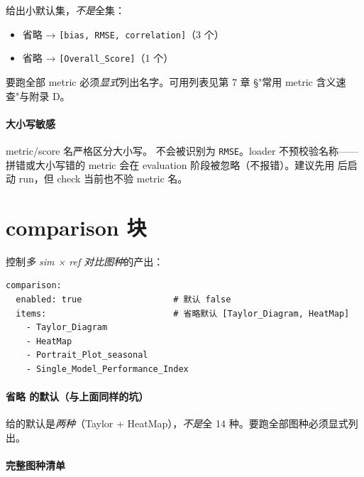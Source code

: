  给出小默认集，\emph{不是}全集：

\begin{itemize}
  \item {} 省略 → \texttt{[bias, RMSE, correlation]}（3 个）
  \item {} 省略 → \texttt{[Overall\_Score]}（1 个）
\end{itemize}

要跑全部 metric 必须\emph{显式}列出名字。可用列表见第 7 章 §"常用 metric 含义速查"与附录 D。

\paragraph{大小写敏感}

metric/score 名严格区分大小写。 不会被识别为 \texttt{RMSE}。loader 不预校验名称——拼错或大小写错的 metric 会在 evaluation 阶段被忽略（不报错）。建议先用  后启动 run，但 check 当前也不验 metric 名。

\section{comparison 块}

 控制\emph{多 sim × ref 对比图种}的产出：

\begin{verbatim}
comparison:
  enabled: true                  # 默认 false
  items:                         # 省略默认 [Taylor_Diagram, HeatMap]
    - Taylor_Diagram
    - HeatMap
    - Portrait_Plot_seasonal
    - Single_Model_Performance_Index
\end{verbatim}

\paragraph{省略  的默认（与上面同样的坑）}

 给的默认是\emph{两种}（Taylor + HeatMap），\emph{不是}全 14 种。要跑全部图种必须显式列出。

\paragraph{完整图种清单}

